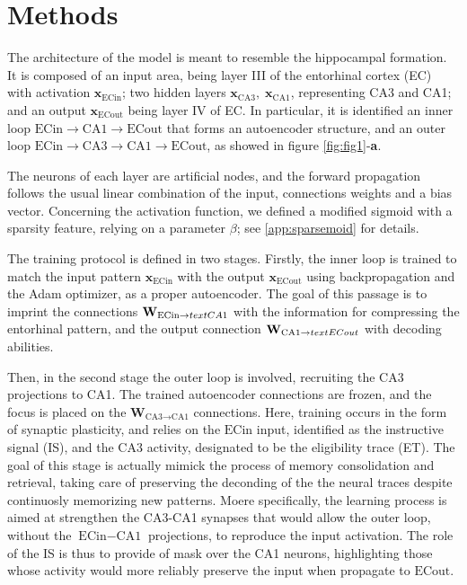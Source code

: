 \section{Methods}


The architecture of the model is meant to resemble the hippocampal formation.
It is composed of an input area, being layer III of the entorhinal cortex (EC) with activation $\textbf{x}_{\text{ECin}}$; two hidden layers $\textbf{x}_{\text{CA3}},\;\textbf{x}_{\text{CA1}}$, representing CA3 and CA1; and an output $\textbf{x}_{\text{ECout}}$ being layer IV of EC.
In particular, it is identified an inner loop $\text{ECin}\to \text{CA1}\to \text{ECout}$ that forms an autoencoder structure, and an outer loop $\text{ECin}\to \text{CA3}\to \text{CA1}\to \text{ECout}$, as showed in figure \ref{fig:fig1}-\textbf{a}.

The neurons of each layer are artificial nodes, and the forward propagation follows the usual linear combination of the input, connections weights and a bias vector.
Concerning the activation function, we defined a modified sigmoid with a sparsity feature, relying on a parameter $\beta$; see \ref{app:sparsemoid} for details.

The training protocol is defined in two stages.
Firstly, the inner loop is trained to match the input pattern $\textbf{x}_{\text{ECin}}$ with the output $\textbf{x}_{\text{ECout}}$ using backpropagation and the Adam optimizer, as a proper autoencoder.
The goal of this passage is to imprint the connections $\textbf{W}_{\text{ECin}\to \\text{CA1}}$ with the information for compressing the entorhinal pattern, and the output connection $\textbf{W}_{\text{CA1}\to \\text{ECout}}$ with decoding abilities.

Then, in the second stage the outer loop is involved, recruiting the CA3 projections to CA1.
The trained autoencoder connections are frozen, and the focus is placed on the $\textbf{W}_{\text{CA3}\to \text{CA1}}$ connections.
Here, training occurs in the form of synaptic plasticity, and relies on the $\text{ECin}$ input, identified as the instructive signal (IS), and the CA3 activity, designated to be the eligibility trace (ET).
The goal of this stage is actually mimick the process of memory consolidation and retrieval, taking care of preserving the deconding of the the neural traces despite continuosly memorizing new patterns.
Moere specifically, the learning process is aimed at strengthen the CA3-CA1 synapses that would allow the outer loop, without the $\text{ECin}-\text{CA1}$ projections, to reproduce the input activation.
The role of the IS is thus to provide of mask over the CA1 neurons, highlighting those whose activity would more reliably preserve the input when propagate to $\text{ECout}$.

